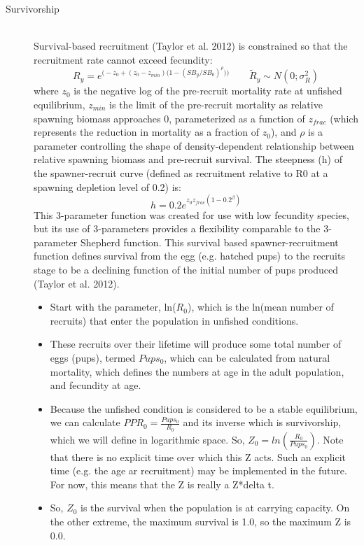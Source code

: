 \begin{description}
	\item[Survivorship]\hfill\\
	Survival-based recruitment (Taylor et al. 2012) is constrained so that the recruitment rate cannot exceed fecundity:
	\begin{equation}{ R_y = e^{\Big(-z_0 + (z_0-z_{min})\big(1-(SB_y/SB_0)^\rho \big)\Big)}\qquad  \tilde{R}_y\sim N(0;\sigma^2_R)}
	\end{equation}
	where $z_0$ is the negative log of the pre-recruit mortality rate at unfished equilibrium, $z_{min}$ is the limit of the pre-recruit mortality as relative spawning biomass approaches 0, parameterized as a function of $z_{frac}$ (which represents the reduction in mortality as a fraction of $z_0$), and $\rho$ is a parameter controlling the shape of density-dependent relationship between relative spawning biomass and pre-recruit survival. The steepness (h) of the spawner-recruit curve (defined as recruitment relative to R0 at a spawning depletion level of 0.2) is:\\
	\begin{equation}
		h = 0.2e^{z_0z_{frac}(1-0.2^\beta)}
	\end{equation}
	This 3-parameter function was created for use with low fecundity species, but its use of 3-parameters provides a flexibility comparable to the 3-parameter Shepherd function.  This survival based spawner-recruitment function defines survival from the egg (e.g. hatched pups) to the recruits stage to be a declining function of the initial number of pups produced (Taylor et al. 2012).
	\begin{itemize}
		\item Start with the parameter, ln($R_0$), which is the ln(mean number of recruits) that enter the population in unfished conditions.
		\item These recruits over their lifetime will produce some total number of eggs (pups), termed $Pups_0$, which can be calculated from natural mortality, which defines the numbers at age in the adult population, and fecundity at age.
		\item Because the unfished condition is considered to be a stable equilibrium, we can calculate $PPR_0 = \frac{Pups_0}{R_0}$ and its inverse which is survivorship, which we will define in logarithmic space.  So, $Z_0 = ln(\frac{R_0}{Pups_0})$.  Note that there is no explicit time over which this Z acts.  Such an explicit time (e.g. the age ar recruitment) may be implemented in the future.  For now, this means that the Z is really a Z*delta t.
		\item So, $Z_0$ is the survival when the population is at carrying capacity.  On the other extreme, the maximum survival is 1.0, so the maximum Z is 0.0.

\end{itemize}
\end{description}
